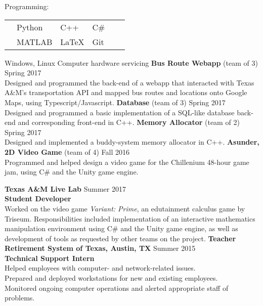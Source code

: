 \documentclass[12pt]{article}
\begin{document}
\begin{flushleft}
\begin{outline}[compactitem]
    \1 Programming: 
    \\
    \vspace{-\baselineskip}\vspace{-\upspacelength}
    \begin{tabularx}{\textwidth}{X X X X X X}
      & Python   & C++ & C\#\upspace \\
      & MATLAB & \LaTeX & Git\upspace \\
    \end{tabularx}
    \vspace{-5px}\upspace
    \1 
    Windows, Linux
      \1
    Computer hardware servicing
    \hfill\hfill
      \1 \textbf{Bus Route Webapp} (team of 3) \hfill Spring 2017
      \\ Designed and programmed the back-end of a webapp that interacted with Texas A\&M's transportation API and mapped bus routes and locations onto Google Maps, using Typescript/Javascript.
      \1 \textbf{Database} (team of 3) \hfill Spring 2017
      \\ Designed and programmed a basic implementation of a SQL-like database back-end and corresponding front-end in C++.
      \1 \textbf{Memory Allocator} (team of 2) \hfill Spring 2017
      \\ Designed and implemented a buddy-system memory allocator in C++.
      \1 \textbf{Asunder, 2D Video Game} (team of 4) \hfill Fall 2016
      \\ Programmed and helped design a video game for the Chillenium 48-hour game jam, using C\# and the Unity game engine.

    \1 \textbf{Texas A\&M Live Lab} \hfill Summer 2017
    \\ \textbf{Student Developer}
    \\ Worked on the video game \textit{Variant: Prime}, an edutainment calculus game by Triseum. Responsibilities included implementation of an interactive mathematics manipulation environment using C\# and the Unity game engine, as well as development of tools as requested by other teams on the project.
    \1 \textbf{Teacher Retirement System of Texas, Austin, TX} \hfill Summer 2015
    \\ \textbf{Technical Support Intern}
    \\ Helped employees with computer- and network-related issues.
    \\ Prepared and deployed workstations for new and existing employees.
    \\ Monitored ongoing computer operations and alerted appropriate staff of problems.


\end{outline}
\end{flushleft}
\end{document}
